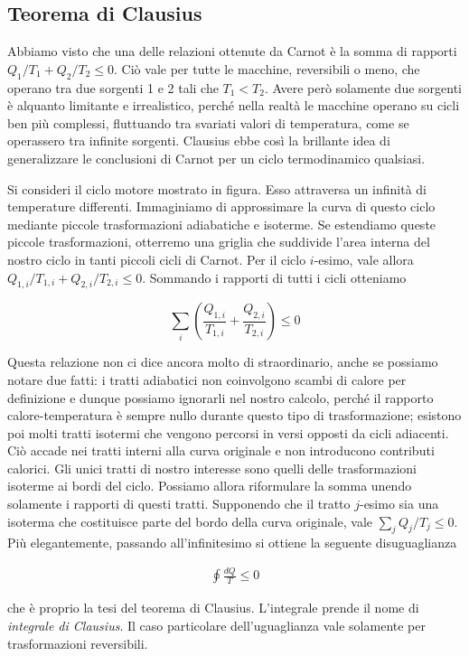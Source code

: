\subsection{Teorema di Clausius}
Abbiamo visto che una delle relazioni ottenute da Carnot è la
somma di rapporti $Q_1/T_1 + Q_2/T_2 \leq 0$. Ciò vale per tutte
le macchine, reversibili o meno, che operano tra due sorgenti 1
e 2 tali che $T_1 < T_2$. Avere però solamente due sorgenti è
alquanto limitante e irrealistico, perché nella realtà le macchine
operano su cicli ben più complessi, fluttuando tra svariati valori
di temperatura, come se operassero tra infinite sorgenti. Clausius
ebbe così la brillante idea di generalizzare le conclusioni di
Carnot per un ciclo termodinamico qualsiasi.

Si consideri il ciclo motore mostrato in figura. Esso attraversa
un infinità di temperature differenti. Immaginiamo di approssimare
la curva di questo ciclo mediante piccole trasformazioni adiabatiche
e isoterme. Se estendiamo queste piccole trasformazioni, otterremo
una griglia che suddivide l'area interna del nostro ciclo in tanti
piccoli cicli di Carnot. Per il ciclo $i$-esimo, vale allora
$Q_{1,i}/T_{1,i} + Q_{2,i}/T_{2,i} \leq 0$. Sommando i rapporti di
tutti i cicli otteniamo

\[ \sum_i \left(\frac{Q_{1,i}}{T_{1,i}} + \frac{Q_{2,i}}{T_{2,i}}\right) \leq 0 \]

\noindent Questa relazione non ci dice ancora molto di straordinario,
anche se possiamo notare due fatti: i tratti adiabatici non coinvolgono
scambi di calore per definizione e dunque possiamo ignorarli nel
nostro calcolo, perché il rapporto calore-temperatura è sempre nullo
durante questo tipo di trasformazione; esistono poi molti tratti
isotermi che vengono percorsi in versi opposti da cicli adiacenti.
Ciò accade nei tratti interni alla curva originale e non introducono
contributi calorici. Gli unici tratti di nostro interesse sono
quelli delle trasformazioni isoterme ai bordi del ciclo. Possiamo
allora riformulare la somma unendo solamente i rapporti di questi
tratti. Supponendo che il tratto $j$-esimo sia una isoterma che
costituisce parte del bordo della curva originale, vale
$\sum_j Q_j/T_j \leq 0$. Più elegantemente, passando all'infinitesimo
si ottiene la seguente disuguaglianza

\begin{align}
    \oint \frac{dQ}{T} \leq 0
\end{align}

\noindent che è proprio la tesi del teorema di Clausius. L'integrale
prende il nome di \textit{integrale di Clausius}. Il caso particolare
dell'uguaglianza vale solamente per trasformazioni reversibili.

